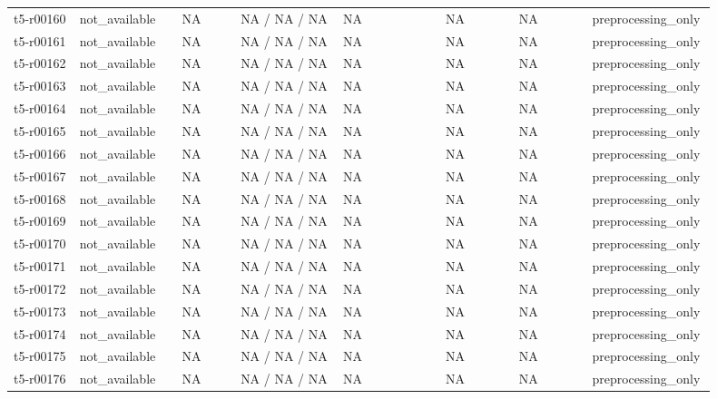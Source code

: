 \begin{longtable}{@{}p{0.09\linewidth}p{0.14\linewidth}p{0.08\linewidth}p{0.14\linewidth}p{0.14\linewidth}p{0.1\linewidth}p{0.1\linewidth}p{0.11\linewidth}@{}}
t5-r00160 & not\_\allowbreak{}available & NA & NA / NA / NA & NA & NA & NA & preprocessing\_\allowbreak{}only \\
t5-r00161 & not\_\allowbreak{}available & NA & NA / NA / NA & NA & NA & NA & preprocessing\_\allowbreak{}only \\
t5-r00162 & not\_\allowbreak{}available & NA & NA / NA / NA & NA & NA & NA & preprocessing\_\allowbreak{}only \\
t5-r00163 & not\_\allowbreak{}available & NA & NA / NA / NA & NA & NA & NA & preprocessing\_\allowbreak{}only \\
t5-r00164 & not\_\allowbreak{}available & NA & NA / NA / NA & NA & NA & NA & preprocessing\_\allowbreak{}only \\
t5-r00165 & not\_\allowbreak{}available & NA & NA / NA / NA & NA & NA & NA & preprocessing\_\allowbreak{}only \\
t5-r00166 & not\_\allowbreak{}available & NA & NA / NA / NA & NA & NA & NA & preprocessing\_\allowbreak{}only \\
t5-r00167 & not\_\allowbreak{}available & NA & NA / NA / NA & NA & NA & NA & preprocessing\_\allowbreak{}only \\
t5-r00168 & not\_\allowbreak{}available & NA & NA / NA / NA & NA & NA & NA & preprocessing\_\allowbreak{}only \\
t5-r00169 & not\_\allowbreak{}available & NA & NA / NA / NA & NA & NA & NA & preprocessing\_\allowbreak{}only \\
t5-r00170 & not\_\allowbreak{}available & NA & NA / NA / NA & NA & NA & NA & preprocessing\_\allowbreak{}only \\
t5-r00171 & not\_\allowbreak{}available & NA & NA / NA / NA & NA & NA & NA & preprocessing\_\allowbreak{}only \\
t5-r00172 & not\_\allowbreak{}available & NA & NA / NA / NA & NA & NA & NA & preprocessing\_\allowbreak{}only \\
t5-r00173 & not\_\allowbreak{}available & NA & NA / NA / NA & NA & NA & NA & preprocessing\_\allowbreak{}only \\
t5-r00174 & not\_\allowbreak{}available & NA & NA / NA / NA & NA & NA & NA & preprocessing\_\allowbreak{}only \\
t5-r00175 & not\_\allowbreak{}available & NA & NA / NA / NA & NA & NA & NA & preprocessing\_\allowbreak{}only \\
t5-r00176 & not\_\allowbreak{}available & NA & NA / NA / NA & NA & NA & NA & preprocessing\_\allowbreak{}only \\

\end{longtable}
